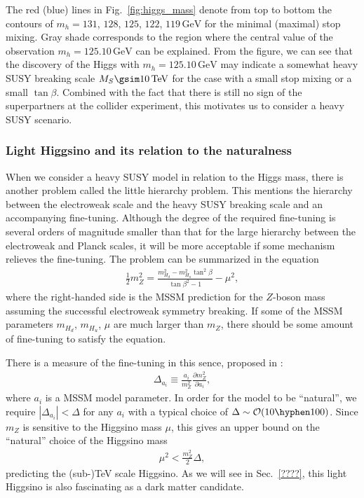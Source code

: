\documentclass[12pt,twoside,book]{article}
\begin{document}
The red (blue) lines in Fig.~\ref{fig:higgs_mass} denote from top to bottom the contours of $m_h = 131$, $128$, $125$, $122$, $119\, \mathrm{GeV}$ for the minimal (maximal) stop mixing.
Gray shade corresponds to the region where the central value of the observation $m_h = 125.10\,\mathrm{GeV}$ can be explained.
From the figure, we can see that the discovery of the Higgs with $m_h = 125.10\,\mathrm{GeV}$ may indicate a somewhat heavy SUSY breaking scale $M_S \gsim 10\,\mathrm{TeV}$ for the case with a small stop mixing or a small $\tan \beta$.
Combined with the fact that there is still no sign of the superpartners at the collider experiment, this motivates us to consider a heavy SUSY scenario.


\subsubsection*{Light Higgsino and its relation to the naturalness}

When we consider a heavy SUSY model in relation to the Higgs mass, there is another problem called the little hierarchy problem.
This mentions the hierarchy between the electroweak scale and the heavy SUSY breaking scale and an accompanying fine-tuning.
Although the degree of the required fine-tuning is several orders of magnitude smaller than that for the large hierarchy between the electroweak and Planck scales, it will be more acceptable if some mechanism relieves the fine-tuning.
The problem can be summarized in the equation
\begin{align}
  \frac{1}{2} m_Z^2 = \frac{m_{H_d}^2 - m_{H_u}^2 \tan^2 \beta}{\tan \beta^2 - 1} - \mu^2,
\end{align}
where the right-handed side is the MSSM prediction for the $Z$-boson mass assuming the successful electroweak symmetry breaking.
If some of the MSSM parameters $m_{H_d}$, $m_{H_u}$, $\mu$ are much larger than $m_Z$, there should be some amount of fine-tuning to satisfy the equation.

There is a measure of the fine-tuning in this sence, proposed in \cite{Ellis:1986yg,Barbieri:1987fn}:
\begin{align}
  \Delta_{a_i} \equiv \frac{a_i}{m_Z^2} \frac{\partial m_Z^2}{\partial a_i},
\end{align}
where $a_i$ is a MSSM model parameter.
In order for the model to be ``natural'', we require $|\Delta_{a_i}| < \Delta$ for any $a_i$ with a typical choice of $\Delta \sim \mathcal{O}(10 \hyphen 100)$.
Since $m_Z$ is sensitive to the Higgsino mass $\mu$, this gives an upper bound on the ``natural'' choice of the Higgsino mass
\begin{align}
  \mu^2 < \frac{m_Z^2}{2} \Delta,
\end{align}
predicting the (sub-)TeV scale Higgsino.
As we will see in Sec.~\ref{????},  this light Higgsino is also fascinating as a dark matter candidate.
\end{document}
